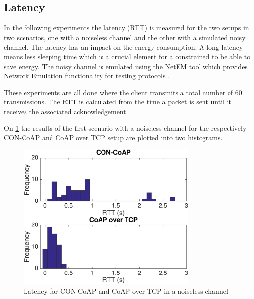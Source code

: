 \subsection{Latency}
In the following experiments the latency (RTT) is measured for the two setups in two scenarios, one with a noiseless channel and the other with a simulated noisy channel. The latency has an impact on the energy consumption. A long latency means less sleeping time which is a crucial element for a constrained to be able to save energy.
The noisy channel is emulated using the NetEM tool which provides Network Emulation functionality for testing protocols \cite{netem19:online}. 

These experiments are all done where the client transmits a total number of 60 transmissions. The RTT is calculated from the time a packet is sent until it receives the associated acknowledgement.


On \figurename{\ref{fig:latencynoiseless}} the results of the first scenario with a noiseless channel for the respectively CON-CoAP and CoAP over TCP setup are plotted into two histograms. 
\begin{figure}[bht]
	\centering
	\includegraphics[width=3.5in]{gfx/latency-clean}
	\caption{Latency for CON-CoAP and CoAP over TCP in a noiseless channel.}
	\label{fig:latencynoiseless}
\end{figure}

